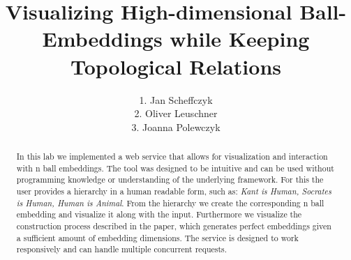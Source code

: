 \documentclass[a4paper, twoside]{report}
\title{Visualizing High-dimensional Ball-Embeddings while Keeping Topological Relations}
\author{1. Jan Scheffczyk \\ 2. Oliver Leuschner \\ 3. Joanna Polewczyk}
\begin{document}


\begin{abstract}
In this lab we implemented a web service that allows for visualization and interaction with n ball embeddings. The tool was designed to be intuitive and can be used without programming knowledge or understanding of the underlying framework. For this the user provides a hierarchy in a human readable form, such as: \textit{Kant is Human, Socrates is Human, Human is Animal}. From the hierarchy we create the corresponding n ball embedding and visualize it along with the input. Furthermore we visualize the construction process described in the paper, which generates perfect embeddings given a sufficient amount of embedding dimensions. The service is designed to work responsively and can handle multiple concurrent requests.
\end{abstract}


\tableofcontents
\listoffigures











\end{document}
